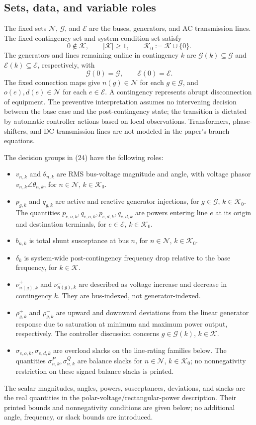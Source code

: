 \documentclass{article}
\begin{document}
\subsection*{Sets, data, and variable roles}
The fixed sets $\mathcal N$, $\mathcal G$, and $\mathcal E$ are the buses, generators, and AC transmission lines. The fixed contingency set and system-condition set satisfy
\[
0\notin\mathcal K,\qquad |\mathcal K|\geq1,\qquad
\mathcal K_0:=\mathcal K\cup\{0\}.
\]
The generators and lines remaining online in contingency $k$ are $\mathcal G(k)\subseteq\mathcal G$ and $\mathcal E(k)\subseteq\mathcal E$, respectively, with
\[
\mathcal G(0)=\mathcal G,\qquad \mathcal E(0)=\mathcal E.
\]
The fixed connection maps give $n(g)\in\mathcal N$ for each $g\in\mathcal G$, and $o(e),d(e)\in\mathcal N$ for each $e\in\mathcal E$. A contingency represents abrupt disconnection of equipment. The preventive interpretation assumes no intervening decision between the base case and the post-contingency state; the transition is dictated by automatic controller actions based on local observations. Transformers, phase-shifters, and DC transmission lines are not modeled in the paper's branch equations.

The decision groups in (24) have the following roles:
\begin{itemize}
\item $v_{n,k}$ and $\theta_{n,k}$ are RMS bus-voltage magnitude and angle, with voltage phasor $v_{n,k}\angle\theta_{n,k}$, for $n\in\mathcal N$, $k\in\mathcal K_0$.
\item $p_{g,k}$ and $q_{g,k}$ are active and reactive generator injections, for $g\in\mathcal G$, $k\in\mathcal K_0$. The quantities $p_{e,o,k},q_{e,o,k},p_{e,d,k},q_{e,d,k}$ are powers entering line $e$ at its origin and destination terminals, for $e\in\mathcal E$, $k\in\mathcal K_0$.
\item $b_{n,k}$ is total shunt susceptance at bus $n$, for $n\in\mathcal N$, $k\in\mathcal K_0$.
\item $\delta_k$ is system-wide post-contingency frequency drop relative to the base frequency, for $k\in\mathcal K$.
\item $\nu_{n(g),k}^{+}$ and $\nu_{n(g),k}^{-}$ are described as voltage increase and decrease in contingency $k$. They are bus-indexed, not generator-indexed.
\item $\rho_{g,k}^{+}$ and $\rho_{g,k}^{-}$ are upward and downward deviations from the linear generator response due to saturation at minimum and maximum power output, respectively. The controller discussion concerns $g\in\mathcal G(k)$, $k\in\mathcal K$.
\item $\sigma_{e,o,k},\sigma_{e,d,k}$ are overload slacks on the line-rating families below. The quantities $\sigma_{n,k}^P,\sigma_{n,k}^Q$ are balance slacks for $n\in\mathcal N$, $k\in\mathcal K_0$; no nonnegativity restriction on these signed balance slacks is printed.
\end{itemize}
The scalar magnitudes, angles, powers, susceptances, deviations, and slacks are the real quantities in the polar-voltage/rectangular-power description. Their printed bounds and nonnegativity conditions are given below; no additional angle, frequency, or slack bounds are introduced.
\end{document}
